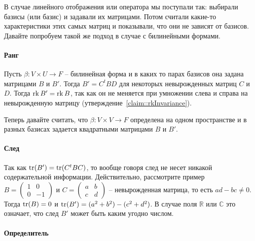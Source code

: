 В случае линейного отображения или оператора мы поступали так: выбирали базисы (или базис) и задавали их матрицами. Потом считали какие-то характеристики этих самых матриц и показывали, что они не зависят от базисов. Давайте попробуем такой же подход в случае с билинейными формами.

\paragraph{Ранг}

Пусть $\beta\colon V\times U\to F$ -- билинейная форма и в каких то парах базисов она задана матрицами $B$ и $B'$. Тогда $B' = C^t B D$ для некоторых невырожденных матриц $C$ и $D$. Тогда $\operatorname{rk} B' = \operatorname{rk} B$, так как он не меняется при умножении слева и справа на невырожденную матрицу (утверждение~\ref{claim::rkInvariance}).

Теперь давайте считать, что $\beta\colon V\times V\to F$ определена на одном пространстве и в разных базисах задается квадратными матрицами $B$ и $B'$.

\paragraph{След}
Так как $\operatorname{tr}(B') = \operatorname{tr}(C^t B C)$, то вообще говоря след не несет никакой содержательной информации. Действительно, рассмотрите пример $B = \begin{pmatrix}{1}&{0}\\{0}&{-1}\end{pmatrix}$ и $C = \begin{pmatrix}{a}&{b}\\{c}&{d}\end{pmatrix}$ -- невырожденная матрица, то есть $ad - bc\neq 0$. Тогда $\operatorname{tr}(B) = 0$ и $\operatorname{tr}(B') = (a^2 + b^2) - (c^2 + d^2)$. В случае поля $\mathbb R$ или $\mathbb C$ это означает, что след $B'$ может быть каким угодно числом.

\paragraph{Определитель}

